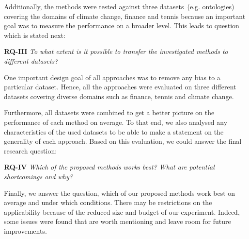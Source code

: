 Additionally, the methods were tested against three datasets~(e.g. ontologies) covering the domains of climate change, finance and tennis because an important goal was to measure the performance on a broader level. This leads to question which is stated next:
 
\textbf{RQ-III} \emph{To what extent is it possible to transfer the investigated methods to different datasets?}

One important design goal of all approaches was to remove any bias to a particular dataset. Hence, all the approaches were evaluated on three different datasets covering diverse domains such as finance, tennis and climate change. 

Furthermore, all datasets were combined to get a better picture on the performance of each method on average. To that end, we also analysed any characteristics of the used datasets to be able to make a statement on the generality of each approach. Based on this evaluation, we could answer the final research question:

\textbf{RQ-IV} \emph{Which of the proposed methods works best? What are potential shortcomings and why?}

Finally, we answer the question, which of our proposed methods work best on average and under which conditions. There may be restrictions on the applicability because of the reduced size and budget of our experiment. Indeed, some issues were found that are worth mentioning and leave room for future improvements. 



